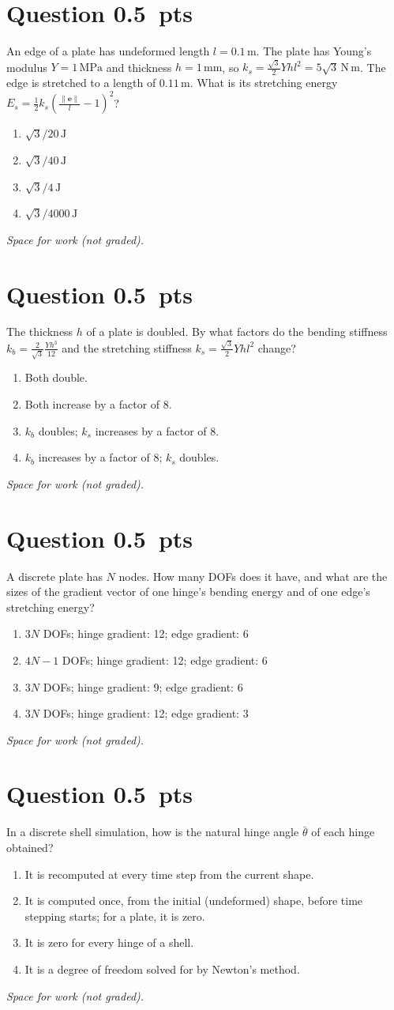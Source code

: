 \documentclass[letterpaper,11pt]{article}
\newcounter{qnum}
\newcommand{\qpts}{0.5}
\newcommand{\mcq}[5]{%
  \clearpage
  \stepcounter{qnum}%
  \section*{Question \theqnum \hfill \normalsize \qpts~pts}
  #1
  \begin{enumerate}[label=(\alph*)]
    \item #2
    \item #3
    \item #4
    \item #5
  \end{enumerate}
  \vspace{3mm}

  \textit{Space for work (not graded).}
}
\begin{document}
%
%
\mcq{An edge of a plate has undeformed length $l = 0.1\,\mathrm{m}$. The plate has Young's modulus $Y = 1\,\mathrm{MPa}$ and thickness $h = 1\,\mathrm{mm}$, so $k_s = \frac{\sqrt{3}}{2} Y h l^2 = 5\sqrt{3}\,\mathrm{N\,m}$. The edge is stretched to a length of $0.11\,\mathrm{m}$. What is its stretching energy $E_s = \frac{1}{2} k_s \left( \frac{\|\mathbf{e}\|}{l} - 1 \right)^2$?}
  {$\sqrt{3}/20\,\mathrm{J}$}
  {$\sqrt{3}/40\,\mathrm{J}$}
  {$\sqrt{3}/4\,\mathrm{J}$}
  {$\sqrt{3}/4000\,\mathrm{J}$}

%
%
\mcq{The thickness $h$ of a plate is doubled. By what factors do the bending stiffness $k_b = \frac{2}{\sqrt{3}} \frac{Y h^3}{12}$ and the stretching stiffness $k_s = \frac{\sqrt{3}}{2} Y h l^2$ change?}
  {Both double.}
  {Both increase by a factor of 8.}
  {$k_b$ doubles; $k_s$ increases by a factor of 8.}
  {$k_b$ increases by a factor of 8; $k_s$ doubles.}

%
%
\mcq{A discrete plate has $N$ nodes. How many DOFs does it have, and what are the sizes of the gradient vector of one hinge's bending energy and of one edge's stretching energy?}
  {$3N$ DOFs; hinge gradient: 12; edge gradient: 6}
  {$4N - 1$ DOFs; hinge gradient: 12; edge gradient: 6}
  {$3N$ DOFs; hinge gradient: 9; edge gradient: 6}
  {$3N$ DOFs; hinge gradient: 12; edge gradient: 3}

%
%
\mcq{In a discrete shell simulation, how is the natural hinge angle $\bar{\theta}$ of each hinge obtained?}
  {It is recomputed at every time step from the current shape.}
  {It is computed once, from the initial (undeformed) shape, before time stepping starts; for a plate, it is zero.}
  {It is zero for every hinge of a shell.}
  {It is a degree of freedom solved for by Newton's method.}
\end{document}
